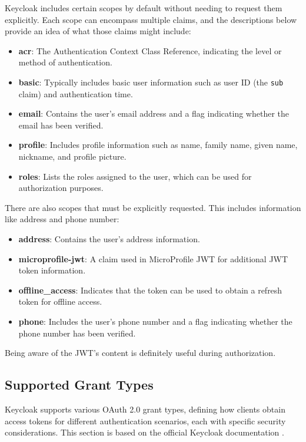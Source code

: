 Keycloak includes certain scopes by default without needing to request them explicitly. Each scope can encompass multiple claims, and the descriptions below provide an idea of what those claims might include:

\begin{itemize} 
    \item \textbf{acr}: The Authentication Context Class Reference, indicating the level or method of authentication. 
    \item \textbf{basic}: Typically includes basic user information such as user ID (the \texttt{sub} claim) and authentication time. 
    \item \textbf{email}: Contains the user's email address and a flag indicating whether the email has been verified. 
    \item 
    \textbf{profile}: Includes profile information such as name, family name, given name, nickname, and profile picture. 
    \item \textbf{roles}: Lists the roles assigned to the user, which can be used for authorization purposes. 
\end{itemize}

There are also scopes that must be explicitly requested. This includes information like address and phone number:

\begin{itemize} 
    \item \textbf{address}: Contains the user's address information. 
    \item \textbf{microprofile-jwt}: A claim used in MicroProfile JWT for additional JWT token information. 
    \item \textbf{offline\_access}: Indicates that the token can be used to obtain a refresh token for offline access. 
    \item \textbf{phone}: Includes the user's phone number and a flag indicating whether the phone number has been verified. 
\end{itemize}

Being aware of the JWT's content is definitely useful during authorization.

\subsection{Supported Grant Types}
Keycloak supports various OAuth 2.0 grant types, defining how clients obtain access tokens for different authentication scenarios, each with specific security considerations. This section is based on the official Keycloak documentation \Parencite{keycloakGrantTypes}.

